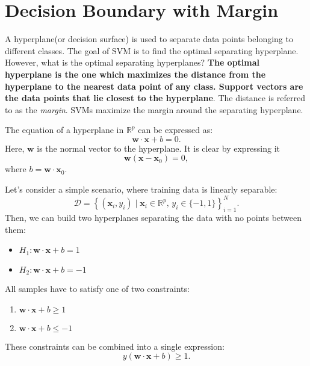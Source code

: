 \section{Decision Boundary with Margin}
A hyperplane(or decision surface) is used to separate data points belonging to different classes. The goal of SVM is to find the optimal separating hyperplane. However, what is the optimal separating hyperplanes? \textbf{The optimal hyperplane is the one which maximizes the distance from the hyperplane to the nearest data point of any class. Support vectors are the data points that lie closest to the hyperplane}. The distance is referred to as the \textit{margin}. SVMs maximize the margin around the separating hyperplane.

The equation of a hyperplane in $\mathbb{R}^p$ can be expressed as:
$$\mathbf{w}\cdot \mathbf{x}+b=0.$$
Here, $\mathbf{w}$ is the normal vector to the hyperplane. It is clear by expressing it 
$$\mathbf{w}(\mathbf{x}-\mathbf{x}_0)=0,$$
where $b = \mathbf{w}\cdot\mathbf{x}_0$. 

Let's consider a simple scenario, where training data is linearly separable: 
$$\mathcal{D} = \left\{ (\mathbf{x}_i, y_i)\mid\mathbf{x}_i \in \mathbb{R}^p,\, y_i \in \{-1,1\}\right\}_{i=1}^N.$$
Then, we can build two hyperplanes separating the data with no points between them:
\begin{itemize}
	\item $H_1:\mathbf{w}\cdot \mathbf{x}+b=1$
	\item $H_2:\mathbf{w}\cdot \mathbf{x}+b=-1$
\end{itemize}

All samples have to satisfy one of two constraints:
\begin{enumerate}
	\item $\mathbf{w}\cdot \mathbf{x}+b\geq1$
	\item $\mathbf{w}\cdot \mathbf{x}+b\leq-1$
\end{enumerate}
These constraints can be combined into a single expression:
$$y(\mathbf{w}\cdot \mathbf{x}+b)\geq 1.$$

